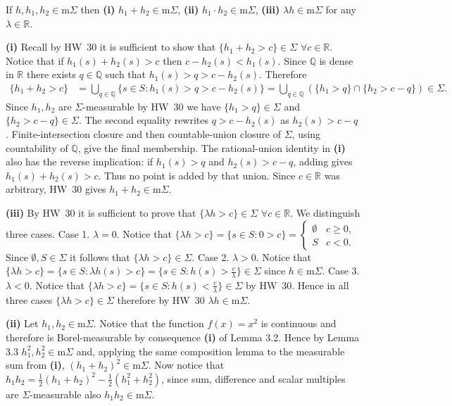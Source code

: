 \documentclass[11pt,a4paper]{article}
\newcommand{\studyheading}[1]{{\color{StudyBlue}\normalfont\bfseries\boldmath #1}}
\newcommand{\studylabel}[1]{\textcolor{StudyBlue}{\textnormal{\bfseries #1}}}
\begin{document}
If $h,h_1,h_2\in\mathrm m\Sigma$ then \studylabel{(i)} $h_1+h_2\in\mathrm m\Sigma$, \studylabel{(ii)} $h_1\cdot h_2\in\mathrm m\Sigma$, \studylabel{(iii)} $\lambda h\in\mathrm m\Sigma$ for any $\lambda\in\mathbb R$.
\par\noindent\studyheading{Proof.}\par\nobreak
\studylabel{(i)} Recall by HW~30 it is sufficient to show that $\{h_1+h_2>c\}\in\Sigma$ $\forall c\in\mathbb R$.
Notice that if $h_1(s)+h_2(s)>c$ then $c-h_2(s)<h_1(s)$.
Since $\mathbb Q$ is dense in $\mathbb R$ there exists $q\in\mathbb Q$ such that $h_1(s)>q>c-h_2(s)$.
Therefore
\[
\begin{aligned}
\{h_1+h_2>c\}
&=\bigcup_{q\in\mathbb Q}\{s\in S:h_1(s)>q>c-h_2(s)\} =\bigcup_{q\in\mathbb Q}(\{h_1>q\}\cap\{h_2>c-q\})\in\Sigma.
\end{aligned}
\]
Since $h_1,h_2$ are $\Sigma$-measurable by HW~30 we have $\{h_1>q\}\in\Sigma$ and $\{h_2>c-q\}\in\Sigma$.
The second equality rewrites $q>c-h_2(s)$ as $h_2(s)>c-q$. Finite-intersection closure and then countable-union closure of $\Sigma$, using countability of $\mathbb Q$, give the final membership.
The rational-union identity in \studylabel{(i)} also has the reverse implication: if $h_1(s)>q$ and $h_2(s)>c-q$, adding gives $h_1(s)+h_2(s)>c$. Thus no point is added by that union. Since $c\in\mathbb R$ was arbitrary, HW~30 gives $h_1+h_2\in\mathrm m\Sigma$.

\studylabel{(iii)} By HW~30 it is sufficient to prove that $\{\lambda h>c\}\in\Sigma$ $\forall c\in\mathbb R$. We distinguish three cases.
Case 1. $\lambda=0$. Notice that $\{\lambda h>c\}=\{s\in S:0>c\}=\begin{cases}\emptyset&c\ge0,\\S&c<0.\end{cases}$
Since $\emptyset,S\in\Sigma$ it follows that $\{\lambda h>c\}\in\Sigma$.
Case 2. $\lambda>0$. Notice that $\{\lambda h>c\}=\{s\in S:\lambda h(s)>c\}=\{s\in S:h(s)>\frac c\lambda\}\in\Sigma$ since $h\in\mathrm m\Sigma$.
Case 3. $\lambda<0$. Notice that $\{\lambda h>c\}=\{s\in S:h(s)<\frac c\lambda\}\in\Sigma$ by HW~30.
Hence in all three cases $\{\lambda h>c\}\in\Sigma$ therefore by HW~30 $\lambda h\in\mathrm m\Sigma$.

\studylabel{(ii)} Let $h_1,h_2\in\mathrm m\Sigma$. Notice that the function $f(x)=x^2$ is continuous and therefore is Borel-measurable by consequence \studylabel{(i)} of Lemma 3.2.
Hence by Lemma 3.3 $h_1^2,h_2^2\in\mathrm m\Sigma$ and, applying the same composition lemma to the measurable sum from \studylabel{(i)}, $(h_1+h_2)^2\in\mathrm m\Sigma$.
Now notice that $h_1h_2=\frac12(h_1+h_2)^2-\frac12(h_1^2+h_2^2)$, since sum, difference and scalar multiples are $\Sigma$-measurable also $h_1h_2\in\mathrm m\Sigma$.
%
\end{document}
